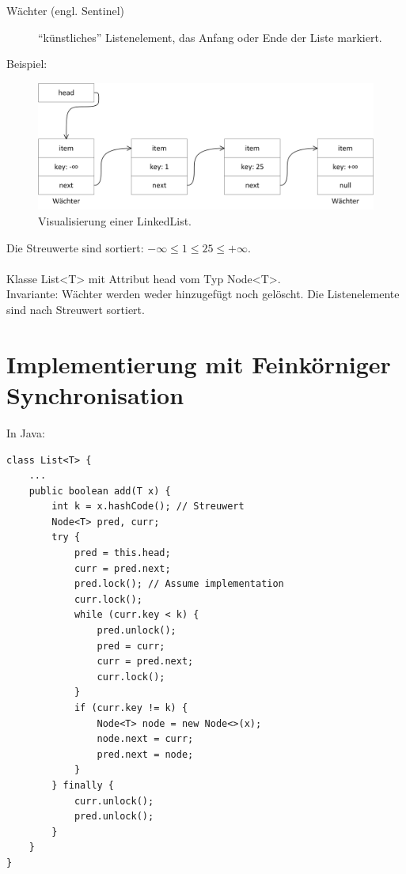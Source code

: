 \begin{description}
	\item[Wächter (engl. Sentinel)] "`künstliches"' Listenelement, das Anfang oder Ende der Liste markiert.
\end{description}

Beispiel:
\begin{figure}[H]
	\begin{center}
		\includegraphics[width=\textwidth]{res/linkedlist}
		\caption{Visualisierung einer LinkedList.}
		\label{pic:linkedlist}
	\end{center}
\end{figure} 
Die Streuwerte sind sortiert: $ -\infty \leq 1 \leq 25 \leq +\infty $.\\
\\
Klasse List<T> mit Attribut head vom Typ Node<T>.\\
Invariante: Wächter werden weder hinzugefügt noch gelöscht. Die Listenelemente sind nach Streuwert sortiert.

\pagebreak

\section{Implementierung mit Feinkörniger Synchronisation}
In Java:
\begin{lstlisting}
class List<T> {
	...
	public boolean add(T x) {
		int k = x.hashCode(); // Streuwert
		Node<T> pred, curr;
		try {
			pred = this.head;
			curr = pred.next;
			pred.lock(); // Assume implementation
			curr.lock();
			while (curr.key < k) {
				pred.unlock();
				pred = curr;
				curr = pred.next;
				curr.lock();
			}
			if (curr.key != k) {
				Node<T> node = new Node<>(x);
				node.next = curr;
				pred.next = node;
			}
		} finally {
			curr.unlock();
			pred.unlock();
		}
	}
}
\end{lstlisting}

